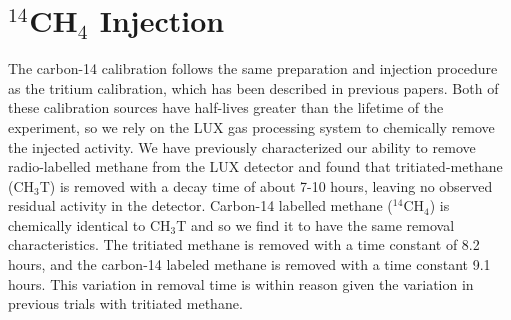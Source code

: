 \section{$^{14}$CH$_4$ Injection}\label{sec:c14inj}
The carbon-14 calibration follows the same preparation and injection procedure as the tritium calibration, which has been described in previous papers\cite{lux_tritium,richard,attila}. Both of these calibration sources have half-lives greater than the lifetime of the experiment, so we rely on the LUX gas processing system to chemically remove the injected activity. We have previously characterized our ability to remove radio-labelled methane from the LUX detector and found that tritiated-methane (CH$_3$T) is removed with a decay time of about 7-10 hours, leaving no observed residual activity in the detector. Carbon-14 labelled methane ($^{14}$CH$_4$) is chemically identical to CH$_3$T and so we find it to have the same removal characteristics. The tritiated methane is removed with a time constant of 8.2 hours, and the carbon-14 labeled methane is removed with a time constant 9.1 hours. This variation in removal time is within reason given the variation in previous trials with tritiated methane.
